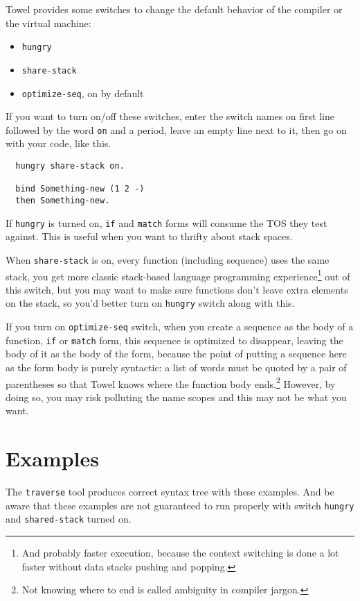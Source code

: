 \documentclass{book}
\begin{document}
Towel provides some switches to change the default behavior of the compiler or the virtual machine:
\begin{itemize}
\item \texttt{hungry}
\item \texttt{share-stack}
\item \texttt{optimize-seq}, on by default
\end{itemize}

If you want to turn on/off these switches, enter the switch names on first line followed by the word \texttt{on} and a period, leave an empty line next to it, then go on with your code, like this.

\begin{verbatim}
  hungry share-stack on.

  bind Something-new (1 2 -)
  then Something-new.
\end{verbatim}

If \texttt{hungry} is turned on, \texttt{if} and \texttt{match} forms will consume the TOS they test against. This is useful when you want to thrifty about stack spaces.

When \texttt{share-stack} is on, every function (including sequence) uses the same stack, you get more classic stack-based language programming experience\footnote{And probably faster execution, because the context switching is done a lot faster without data stacks pushing and popping.} out of this switch, but you may want to make sure functions don't leave extra elements on the stack, so you'd better turn on \texttt{hungry} switch along with this.

If you turn on \texttt{optimize-seq} switch, when you create a sequence as the body of a function, \texttt{if} or \texttt{match} form, this sequence is optimized to disappear, leaving the body of it as the body of the form, because the point of putting a sequence here as the form body is purely syntactic: a list of words must be quoted by a pair of parentheses so that Towel knows where the function body ends.\footnote{Not knowing where to end is called ambiguity in compiler jargon.} However, by doing so, you may risk polluting the name scopes and this may not be what you want.

\chapter{Examples}
\label{chap:examples}

The \texttt{traverse} tool produces correct syntax tree with these examples. And be aware that these examples are not guaranteed to run properly with switch \texttt{hungry} and \texttt{shared-stack} turned on.
\end{document}
